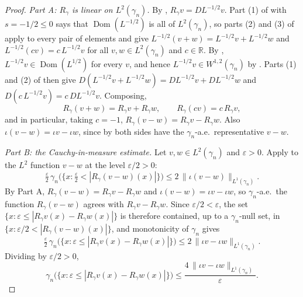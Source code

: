\begin{proof}
\emph{Part A: $R_\gamma$ is linear on $L^2(\gamma_n)$.}
By , $R_\gamma v = D L^{-1/2} v$.  Part (1) of
 with $s = -1/2 \leq 0$ says that
$\operatorname{Dom}(L^{-1/2})$ is all of $L^2(\gamma_n)$, so parts (2) and (3) of
 apply to every pair of elements and give
$L^{-1/2}(v+w) = L^{-1/2}v + L^{-1/2}w$ and
$L^{-1/2}(cv) = c\,L^{-1/2}v$ for all $v,w \in L^2(\gamma_n)$ and $c \in \mathbb{R}$.
By , $L^{-1/2}v \in \operatorname{Dom}(L^{1/2})$ for every
$v$, and hence $L^{-1/2}v \in W^{1,2}(\gamma_n)$ by .
Parts (1) and (2) of  then give
$D(L^{-1/2}v + L^{-1/2}w) = D L^{-1/2}v + D L^{-1/2}w$ and
$D(c\,L^{-1/2}v) = c\,D L^{-1/2}v$.  Composing,
\begin{equation*}
  R_\gamma(v+w) = R_\gamma v + R_\gamma w, \qquad R_\gamma(cv) = c\,R_\gamma v ,
  \tag{A}
\end{equation*}
and in particular, taking $c = -1$, $R_\gamma(v-w) = R_\gamma v - R_\gamma w$.
Also $\iota(v-w) = \iota v - \iota w$, since by  both sides have the
$\gamma_n$-a.e.\ representative $v - w$.

\emph{Part B: the Cauchy-in-measure estimate.}
Let $v,w \in L^2(\gamma_n)$ and $\varepsilon > 0$.  Apply  to the
$L^2$ function $v-w$ at the level $\varepsilon/2 > 0$:
\[
  \tfrac{\varepsilon}{2}\,
    \gamma_n\bigl(\{x : \tfrac{\varepsilon}{2} < |R_\gamma(v-w)(x)|\}\bigr)
    \leq 2\,\|\iota(v-w)\|_{L^1(\gamma_n)} .
\]
By Part A, $R_\gamma(v-w) = R_\gamma v - R_\gamma w$ and
$\iota(v-w) = \iota v - \iota w$, so $\gamma_n$-a.e.\ the function
$R_\gamma(v-w)$ agrees with $R_\gamma v - R_\gamma w$.  Since
$\varepsilon/2 < \varepsilon$, the set $\{x : \varepsilon \leq |R_\gamma v(x) -
R_\gamma w(x)|\}$ is therefore contained, up to a $\gamma_n$-null set, in
$\{x : \varepsilon/2 < |R_\gamma(v-w)(x)|\}$, and monotonicity of $\gamma_n$ gives
\[
  \tfrac{\varepsilon}{2}\,
  \gamma_n\bigl(\{x : \varepsilon \leq |R_\gamma v(x) - R_\gamma w(x)|\}\bigr)
    \leq 2\,\|\iota v - \iota w\|_{L^1(\gamma_n)} .
\]
Dividing by $\varepsilon/2 > 0$,
\begin{equation*}
  \gamma_n\bigl(\{x : \varepsilon \leq |R_\gamma v(x) - R_\gamma w(x)|\}\bigr)
    \leq \frac{4\,\|\iota v - \iota w\|_{L^1(\gamma_n)}}{\varepsilon} .
  \tag{B}
\end{equation*}


\end{proof}
